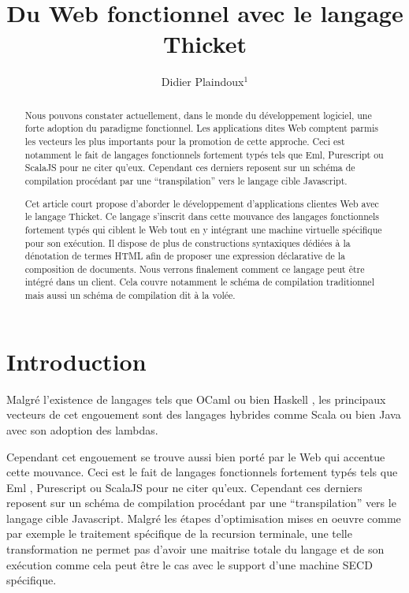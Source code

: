 \documentclass[twoside,a4paper]{article}
\title{ Du Web fonctionnel avec le langage Thicket }
\author{Didier Plaindoux$^1$}
\affiliation{\begin{tabular}{rr} 
    \\ 1:  Fungus, Le village 31430 Gratens, France
    \\     {\tt d.plaindoux@fungus.fr}
\end{tabular}}
\begin{document}
\setcounter{page}{1}
\maketitle

\begin{abstract}
Nous pouvons  constater actuellement,  dans le monde  du développement
logiciel,   une  forte   adoption   du   paradigme  fonctionnel.   Les
applications  dites   Web  comptent  parmis  les   vecteurs  les  plus
importants pour la promotion de  cette approche. Ceci est notamment le
fait de langages fonctionnels fortement typés tels que Eml, Purescript
ou ScalaJS pour  ne citer qu’eux. Cependant ces  derniers reposent sur
un schéma  de compilation  procédant par  une “transpilation”  vers le
langage cible Javascript.

Cet article  court propose  d'aborder le  développement d'applications
clientes Web avec le langage  Thicket. Ce langage s’inscrit dans cette
mouvance des langages fonctionnels fortement  typés qui ciblent le Web
tout  en  y  intégrant  une  machine  virtuelle  spécifique  pour  son
exécution. Il dispose  de plus de constructions  syntaxiques dédiées à
la  dénotation  de  termes  HTML   afin  de  proposer  une  expression
déclarative de  la composition  de documents. Nous  verrons finalement
comment  ce langage  peut être  intégré  dans un  client. Cela  couvre
notamment le schéma  de compilation traditionnel mais  aussi un schéma
de compilation dit à la volée.
\end{abstract}

\section{Introduction}

Malgré l'existence  de langages  tels que  OCaml \cite{ocaml}  ou bien
Haskell \cite{haskell}, les principaux vecteurs de cet engouement sont
des  langages hybrides  comme  Scala \cite{scala}  ou bien  Java
\cite{java} avec son adoption des lambdas.

Cependant cet  engouement se trouve  aussi bien  porté par le  Web qui
accentue cette  mouvance. Ceci  est le  fait de  langages fonctionnels
fortement typés tels que  Eml \cite{elm}, Purescript \cite{purescript}
ou ScalaJS \cite{scalajs} pour ne citer qu’eux. Cependant ces derniers
reposent   sur   un   schéma   de  compilation   procédant   par   une
“transpilation” vers  le langage  cible Javascript. Malgré  les étapes
d’optimisation  mises  en  oeuvre  comme  par  exemple  le  traitement
spécifique  de la  recursion  terminale, une  telle transformation  ne
permet pas d’avoir une maitrise totale  du langage et de son exécution
comme  cela peut  être  le  cas avec  le  support  d’une machine  SECD
spécifique.
\end{document}
